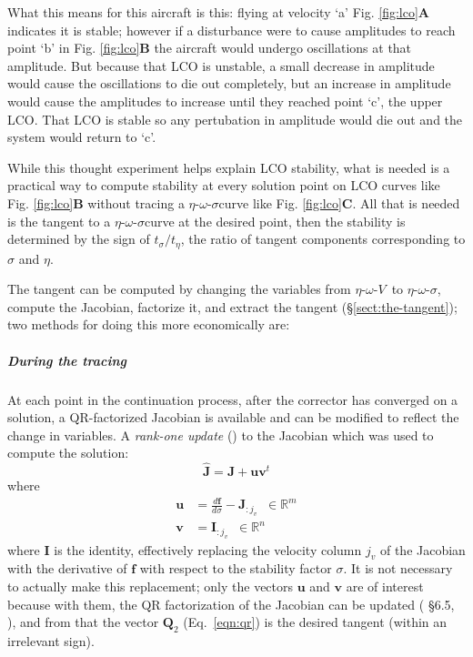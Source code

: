 \documentclass[10pt,openany,twoside]{book}
\numberwithin{equation}{section}   %
\newcommand{\Matrix}[1]{\boldsymbol{#1}}
\newcommand{\Vector}[1]{\boldsymbol{#1}}
\newcommand{\Sectref}[1]{\S\ref{#1}}
\newcommand{\Eqn}[1]{Eq.\ \ref{#1}}
\newcommand{\Figref}[1]{Fig. \ref{#1}}
\newcommand{\EOV}{$\eta$-$\omega$-$V$\:}                 %
\newcommand{\EOS}{$\eta$-$\omega$-$\sigma$\:}            %
\begin{document}
What this means for this aircraft is this: flying at velocity `a'
\Figref{fig:lco}{\bf A} indicates it is stable; however if a disturbance
were to cause amplitudes to reach point `b' in
\Figref{fig:lco}{\bf B}
the aircraft would undergo oscillations at that amplitude. But because
that LCO is unstable, a small decrease in amplitude would cause the
oscillations to die out completely, but an increase in amplitude would
cause the amplitudes to increase until they reached point `c', the
upper LCO. That LCO is stable so any pertubation in amplitude would
die out and the system would return to `c'.

While this thought experiment helps explain LCO stability, what is
needed is a practical way to compute stability at every solution point on
LCO curves like
\Figref{fig:lco}{\bf B}
without tracing a \EOS curve like \Figref{fig:lco}{\bf C}.
All that is needed is the tangent to a \EOS curve at the desired point,
then the stability is determined by the sign of
$t_{\sigma}/t_{\eta}$,
the ratio of tangent components corresponding to $\sigma$ and $\eta$.

The tangent can be computed by changing the variables from \EOV\ to \EOS,
compute the Jacobian, factorize it, and extract the tangent
(\Sectref{sect:the-tangent}); two methods for doing this more economically
are:

\subparagraph{During the tracing}
At each point in the continuation process, after the corrector has
converged on a solution, a QR-factorized Jacobian is available and
can be modified to reflect the change in variables.
A \emph{rank-one update} (\cite{golub2013matrix}) to the Jacobian which was
used to compute the solution:
\begin{equation}
\Matrix{\hat{J}} = \Matrix{J} + \Vector{u}\Vector{v}^t
\end{equation}
where
\begin{align}
\Vector{u} &= \frac{d\Vector{f}}{d\sigma} - \Matrix{J}_{:j_v} \;\; \in \mathbb{R}^m \nonumber \\
\Vector{v} &= \Matrix{I}_{:j_v} \;\; \in \mathbb{R}^n
\end{align}
where $\Matrix{I}$ is the identity,
effectively replacing the velocity column $j_v$ of the Jacobian with the derivative
of $\Vector{f}$ with respect to the stability factor $\sigma$.
It is not necessary to actually make this replacement; only the vectors
$\Vector{u}$ and $\Vector{v}$ are of interest because with them,
the QR factorization of the Jacobian can be updated
(\cite{golub2013matrix} \S 6.5, \cite{qrupdate}),
and from that the vector $\Matrix{Q}_2$
(\Eqn{eqn:qr})
is the desired tangent (within an irrelevant sign).
\end{document}
